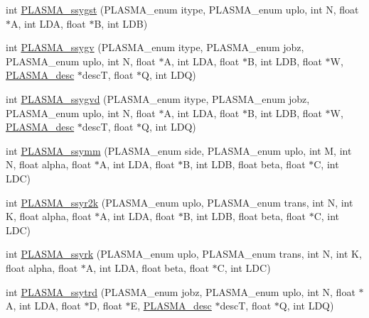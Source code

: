 \begin{DoxyCompactItemize}
\item 
int \hyperlink{group__float_ga66b77c0de44f80760c4184756250e75e_ga66b77c0de44f80760c4184756250e75e}{P\+L\+A\+S\+M\+A\+\_\+ssygst} (P\+L\+A\+S\+M\+A\+\_\+enum itype, P\+L\+A\+S\+M\+A\+\_\+enum uplo, int N, float $\ast$A, int L\+D\+A, float $\ast$B, int L\+D\+B)
\item 
int \hyperlink{group__float_gaa5deb8e85d037eff767d9a9e5e99fad9_gaa5deb8e85d037eff767d9a9e5e99fad9}{P\+L\+A\+S\+M\+A\+\_\+ssygv} (P\+L\+A\+S\+M\+A\+\_\+enum itype, P\+L\+A\+S\+M\+A\+\_\+enum jobz, P\+L\+A\+S\+M\+A\+\_\+enum uplo, int N, float $\ast$A, int L\+D\+A, float $\ast$B, int L\+D\+B, float $\ast$W, \hyperlink{structplasma__desc__t}{P\+L\+A\+S\+M\+A\+\_\+desc} $\ast$desc\+T, float $\ast$Q, int L\+D\+Q)
\item 
int \hyperlink{group__float_ga366bd2466847e2b9f29bd39a9d699fb9_ga366bd2466847e2b9f29bd39a9d699fb9}{P\+L\+A\+S\+M\+A\+\_\+ssygvd} (P\+L\+A\+S\+M\+A\+\_\+enum itype, P\+L\+A\+S\+M\+A\+\_\+enum jobz, P\+L\+A\+S\+M\+A\+\_\+enum uplo, int N, float $\ast$A, int L\+D\+A, float $\ast$B, int L\+D\+B, float $\ast$W, \hyperlink{structplasma__desc__t}{P\+L\+A\+S\+M\+A\+\_\+desc} $\ast$desc\+T, float $\ast$Q, int L\+D\+Q)
\item 
int \hyperlink{group__float_gaaffcd386f207f3e3a3073a803e27e3f1_gaaffcd386f207f3e3a3073a803e27e3f1}{P\+L\+A\+S\+M\+A\+\_\+ssymm} (P\+L\+A\+S\+M\+A\+\_\+enum side, P\+L\+A\+S\+M\+A\+\_\+enum uplo, int M, int N, float alpha, float $\ast$A, int L\+D\+A, float $\ast$B, int L\+D\+B, float beta, float $\ast$C, int L\+D\+C)
\item 
int \hyperlink{group__float_gafac964a38a7c62696c3b95d35108ad9b_gafac964a38a7c62696c3b95d35108ad9b}{P\+L\+A\+S\+M\+A\+\_\+ssyr2k} (P\+L\+A\+S\+M\+A\+\_\+enum uplo, P\+L\+A\+S\+M\+A\+\_\+enum trans, int N, int K, float alpha, float $\ast$A, int L\+D\+A, float $\ast$B, int L\+D\+B, float beta, float $\ast$C, int L\+D\+C)
\item 
int \hyperlink{group__float_gae83f0347570d23dc62dd8b298eb14ad6_gae83f0347570d23dc62dd8b298eb14ad6}{P\+L\+A\+S\+M\+A\+\_\+ssyrk} (P\+L\+A\+S\+M\+A\+\_\+enum uplo, P\+L\+A\+S\+M\+A\+\_\+enum trans, int N, int K, float alpha, float $\ast$A, int L\+D\+A, float beta, float $\ast$C, int L\+D\+C)
\item 
int \hyperlink{group__float_gadfee26871dee9a24b201bc329fccd81b_gadfee26871dee9a24b201bc329fccd81b}{P\+L\+A\+S\+M\+A\+\_\+ssytrd} (P\+L\+A\+S\+M\+A\+\_\+enum jobz, P\+L\+A\+S\+M\+A\+\_\+enum uplo, int N, float $\ast$A, int L\+D\+A, float $\ast$D, float $\ast$E, \hyperlink{structplasma__desc__t}{P\+L\+A\+S\+M\+A\+\_\+desc} $\ast$desc\+T, float $\ast$Q, int L\+D\+Q)

\end{DoxyCompactItemize}
